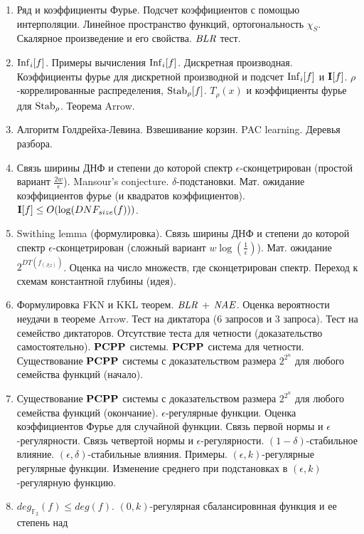 \begin{enumerate}
    \item Ряд и коэффициенты Фурье. Подсчет коэффициентов с помощью интерполяции. Линейное пространство функций,
        ортогональность $\chi_S$. Скалярное произведение и его свойства. $\mathit{BLR}$ тест.
    \item $\mathrm{Inf}_i[f]$. Примеры вычисления $\mathrm{Inf}_i[f]$. Дискретная производная. Коэффициенты фурье для дискретной производной
        и подсчет $\mathrm{Inf}_i[f]$ и $\mathbf{I}[f]$. $\rho$-коррелированные распределения, $\mathrm{Stab}_{\rho}[f]$. $T_{\rho}(x)$ и
        коэффициенты фурье для $\mathrm{Stab}_{\rho}$. Теорема Arrow.
    \item Алгоритм Голдрейха-Левина. Взвешивание корзин. PAC learning. Деревья разбора.
    \item Связь ширины ДНФ и степени до которой спектр $\epsilon$-сконцетрирован (простой вариант
        $\frac{2w}{\epsilon}$). Mansour's conjecture. $\delta$-подстановки. Мат. ожидание коэффициентов фурье (и квадратов
        коэффициентов). $\mathbf{I}[f] \le O(\log(DNF_{size}(f)))$.
    \item Swithing lemma (формулировка). Связь ширины ДНФ и степени до которой спектр $\epsilon$-сконцетрирован (сложный
        вариант $w \log(\frac{1}{\epsilon})$). Мат. ожидание $2^{DT(f_{(J|z)})}$. Оценка на число множеств, где
        сконцетрирован спектр. Переход к схемам константной глубины (идея).
    \item Формулировка FKN и KKL теорем. $\mathit{BLR}$ + $\mathit{NAE}$. Оценка вероятности неудачи в теореме Arrow. Тест на
        диктатора ($6$ запросов и $3$ запроса). Тест на семейство диктаторов. Отсутствие теста для четности (доказательство
        самостоятельно). $\mathbf{PCPP}$ системы. $\mathbf{PCPP}$ система для четности. Существование $\mathbf{PCPP}$ системы с доказательством
        размера $2^{2^{n}}$ для любого семейства функций (начало).
    \item Существование $\mathbf{PCPP}$ системы с доказательством размера $2^{2^{n}}$ для любого семейства функций
        (окончание). $\epsilon$-регулярные функции. Оценка коэффициентов Фурье для случайной функции. Связь первой нормы и
        $\epsilon$-регулярности. Связь четвертой нормы и $\epsilon$-регулярности. $(1 - \delta)$-стабильное
        влияние. $(\epsilon, \delta)$-стабильные влияния. Примеры. $(\epsilon, k)$-регулярные регулярные функции. Изменение
        среднего при подстановках в $(\epsilon, k)$-регулярную функцию.
    \item $deg_{\mathbb{F}_2}(f) \le deg(f)$. $(0, k)$-регулярная сбалансировнная функция и ее степень над

\end{enumerate}
